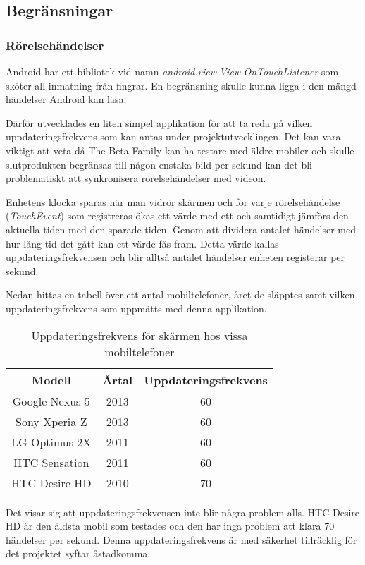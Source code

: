 \subsection{Begränsningar}

\subsubsection{Rörelsehändelser}
\label{touchevents}
Android har ett bibliotek vid namn \emph{android.view.View.OnTouchListener}\parencite{touchlistener} som sköter all inmatning från fingrar. En begränsning skulle kunna ligga i den mängd händelser Android kan läsa. 

Därför utvecklades en liten simpel applikation för att ta reda på vilken uppdateringsfrekvens som kan antas under projektutvecklingen. Det kan vara viktigt att veta då The Beta Family kan ha testare med äldre mobiler och skulle slutprodukten begränsas till någon enstaka bild per sekund kan det bli problematiskt att synkronisera rörelsehändelser med videon.

Enhetens klocka sparas när man vidrör skärmen och för varje rörelsehändelse (\emph{TouchEvent}) som registreras ökas ett värde med ett och samtidigt jämförs den aktuella tiden med den sparade tiden. Genom att dividera antalet händelser med hur lång tid det gått kan ett värde fås fram. Detta värde kallas uppdateringsfrekvensen och blir alltså antalet händelser enheten registerar per sekund.

Nedan hittas en tabell över ett antal mobiltelefoner, året de släpptes samt vilken uppdateringsfrekvens som uppmätts med denna applikation.
\begin{table}[h!]
	\begin{center}
	\begin{tabular}{| c | c | c |}
		\hline
		Modell & Årtal & Uppdateringsfrekvens \\
		\hline
		Google Nexus 5 & 2013 & 60 \\
		Sony Xperia Z & 2013 & 60 \\
		LG Optimus 2X & 2011 & 60 \\
		HTC Sensation & 2011 & 60 \\
		HTC Desire HD & 2010 & 70 \\
		\hline
	\end{tabular}
	\end{center}
	\label{tab:uppdateringsfrekvens}
	\caption{Uppdateringsfrekvens för skärmen hos vissa mobiltelefoner}
\end{table}

Det visar sig att uppdateringsfrekvensen inte blir några problem alls. HTC Desire HD är den äldsta mobil som testades och den har inga problem att klara 70 händelser per sekund. Denna uppdateringsfrekvens är med säkerhet tillräcklig för det projektet syftar åstadkomma.